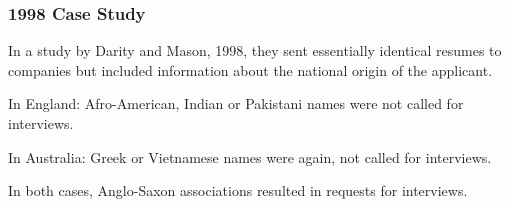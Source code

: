 \begin{frame}
\frametitle{1998 Case Study}

In a study by Darity and Mason, 1998, they sent essentially identical resumes to companies but included information about the national origin of the applicant.

In England: Afro-American, Indian or Pakistani names were not called for interviews.

In Australia: Greek or Vietnamese names were again, not called for interviews.

In both cases, Anglo-Saxon associations resulted in requests for interviews.

\end{frame}




